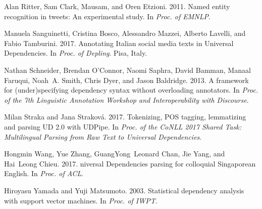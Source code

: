 \documentclass[11pt,a4paper]{article}
\begin{document}
\begin{thebibliography}{}
	Alan Ritter, Sam Clark, Mausam, and Oren Etzioni. 2011.
	\newblock Named entity recognition in tweets: An experimental study.
	\newblock In {\em Proc. of EMNLP\/}.
	
	Manuela Sanguinetti, Cristina Bosco, Alessandro Mazzei, Alberto Lavelli, and
	Fabio Tamburini. 2017.
	\newblock Annotating {I}talian social media texts in {U}niversal
	{D}ependencies.
	\newblock In {\em Proc. of Depling\/}. Pisa, Italy.
	
	Nathan Schneider, Brendan O'Connor, Naomi Saphra, David Bamman, Manaal Faruqui,
	Noah~A. Smith, Chris Dyer, and Jason Baldridge. 2013.
	\newblock A framework for (under)specifying dependency syntax without
	overloading annotators.
	\newblock In {\em Proc. of the 7th Linguistic Annotation Workshop and
		Interoperability with Discourse\/}.
	
	Milan Straka and Jana Strakov\'{a}. 2017.
	\newblock Tokenizing, {POS} tagging, lemmatizing and parsing {UD} 2.0 with
	{UDPipe}.
	\newblock In {\em Proc. of the CoNLL 2017 Shared Task: Multilingual Parsing
		from Raw Text to Universal Dependencies\/}.
	
	Hongmin Wang, Yue Zhang, GuangYong~Leonard Chan, Jie Yang, and Hai~Leong Chieu.
	2017.
	niversal {D}ependencies parsing for colloquial {S}ingaporean
	{E}nglish.
	\newblock In {\em Proc. of ACL\/}.
	
	Hiroyasu Yamada and Yuji Matsumoto. 2003.
	\newblock Statistical dependency analysis with support vector machines.
	\newblock In {\em Proc. of IWPT\/}.
	
\end{thebibliography}
\end{document}
